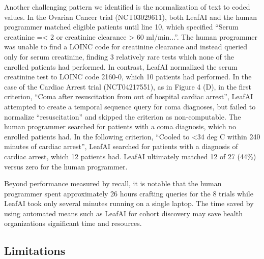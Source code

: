 \documentclass[../main.tex]{subfiles}
\begin{document}
Another challenging pattern we identified is the normalization of text to coded values. In the Ovarian Cancer trial (NCT03029611), both LeafAI and the human programmer matched eligible patients until line 10, which specified “Serum creatinine =< 2 or creatinine clearance > 60 ml/min...”. The human programmer was unable to find a LOINC code for creatinine clearance and instead queried only for serum creatinine, finding 3 relatively rare tests which none of the enrolled patients had performed. In contrast, LeafAI normalized the serum creatinine test to LOINC code 2160-0, which 10 patients had performed. In the case of the Cardiac Arrest trial (NCT04217551), as in Figure 4 (D), in the first criterion, “Coma after resuscitation from out of hospital cardiac arrest”, LeafAI attempted to create a temporal sequence query for coma diagnoses, but failed to normalize “resuscitation” and skipped the criterion as non-computable. The human programmer searched for patients with a coma diagnosis, which no enrolled patients had. In the following criterion, “Cooled to <34 deg C within 240 minutes of cardiac arrest”, LeafAI searched for patients with a diagnosis of cardiac arrest, which 12 patients had. LeafAI ultimately matched 12 of 27 (44\%) versus zero for the human programmer.  

Beyond performance measured by recall, it is notable that the human programmer spent approximately 26 hours crafting queries for the 8 trials while LeafAI took only several minutes running on a single laptop. The time saved by using automated means such as LeafAI for cohort discovery may save health organizations significant time and resources.

\subsection*{Limitations}
\end{document}
